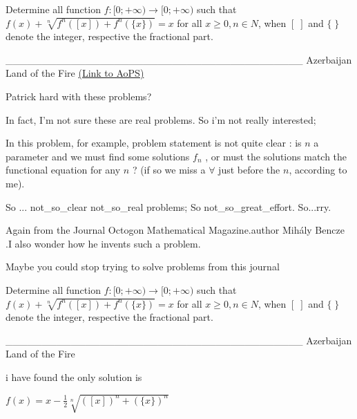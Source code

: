 \begin{problem}
	Determine all function ${{f: \mathbb[0;+\infty)}\to\mathbb[0;+\infty)}$  such that $f(x)+\sqrt[n]{f^n([ x ])+f^n(\{ x \})}=x$
for all $x{\ge}0, n{\in}N$, when $[ \; ]$ and  $\{ \; \}$ denote the integer, respective the fractional part.

_________________________________________
Azerbaijan Land of the Fire 
	\flushright \href{https://artofproblemsolving.com/community/c6h527145}{(Link to AoPS)}
\end{problem}



\begin{solution}
	Patrick hard with these problems?
\end{solution}



\begin{solution}
	In fact, I'm not sure these are real problems. So i'm not really interested;

In this problem, for example, problem statement is not quite clear : is $n$ a parameter and we must find some solutions $f_n$ , or must the solutions match the functional equation for any $n$ ? (if so we miss a $\forall$ just before the $n$, according to me).

So ... not_so_clear not_so_real problems;
So not_so_great_effort.
So...rry.
\end{solution}



\begin{solution}
	Again from the Journal Octogon Mathematical Magazine.author Mihály Bencze .I also wonder how he invents such a problem.
\end{solution}



\begin{solution}
	Maybe you could stop trying to solve problems from this journal
\end{solution}



\begin{solution}
	\begin{tcolorbox}Determine all function ${{f: \mathbb[0;+\infty)}\to\mathbb[0;+\infty)}$  such that $f(x)+\sqrt[n]{f^n([ x ])+f^n(\{ x \})}=x$
for all $x{\ge}0, n{\in}N$, when $[ \; ]$ and  $\{ \; \}$ denote the integer, respective the fractional part.

_________________________________________
Azerbaijan Land of the Fire \end{tcolorbox}
i have found the only solution is

$f(x)=x-\frac 1 2 \sqrt[n]{([ x ])^n+(\{ x \})^n}$
\end{solution}



